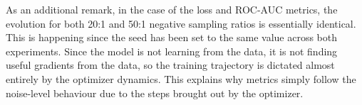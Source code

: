 As an additional remark, in the case of the loss and ROC-AUC metrics, the evolution for both 20:1 and 50:1 negative sampling ratios is essentially identical. This is happening since the seed has been set to the same value across both experiments. Since the model is not learning from the data, it is not finding useful gradients from the data, so the training trajectory is dictated almost entirely by the optimizer dynamics. This explains why metrics simply follow the noise-level behaviour due to the steps brought out by the optimizer.



